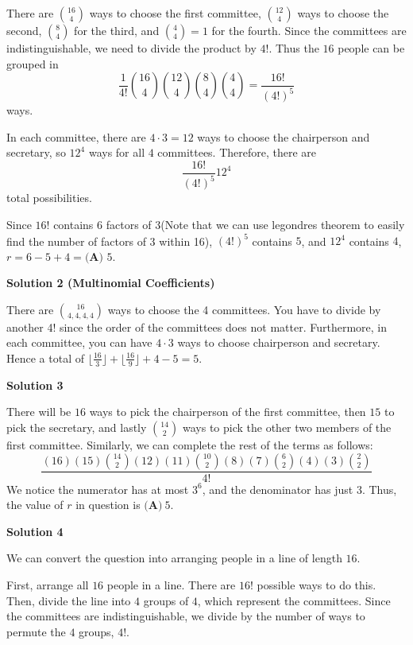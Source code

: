 \begin{enumerate}
There are ${16 \choose 4}$ ways to choose the first committee, ${12 \choose 4}$ ways to choose the second, ${8 \choose 4}$ for the third, and ${4 \choose 4}=1$ for the fourth. Since the committees are indistinguishable, we need to divide the product by $4!$. Thus the $16$ people can be grouped in
 \[\frac{1}{4!}{16 \choose 4}{12 \choose 4}{8 \choose 4}{4 \choose 4}=\frac{16!}{(4!)^5}\]ways.

 In each committee, there are $4 \cdot 3=12$ ways to choose the chairperson and secretary, so $12^4$ ways for all $4$ committees. Therefore, there are
 \[\frac{16!}{(4!)^5}12^4\]total possibilities.

 Since $16!$ contains $6$ factors of $3$(Note that we can use legondres theorem to easily find the number of factors of 3 within 16), $(4!)^5$ contains $5$, and $12^4$ contains $4$, $r=6-5+4=\boxed{\textbf{(A) }5}$.

 



\textbf{Solution 2 (Multinomial Coefficients)}

There are $\binom{16}{4,4,4,4}$ ways to choose the 4 committees. You have to divide by another 4! since the order of the committees does not matter. Furthermore, in each committee, you can have $4 \cdot 3$ ways to choose chairperson and secretary. Hence a total of $\lfloor{\frac{16}{3}\rfloor}+\lfloor{\frac{16}{9}\rfloor}+4-5=5.$




\textbf{Solution 3}

There will be $16$ ways to pick the chairperson of the first committee, then $15$ to pick the secretary, and lastly ${14 \choose 2}$ ways to pick the other two members of the first committee. Similarly, we can complete the rest of the terms as follows:
 \[\frac{(16)(15){14 \choose 2}(12)(11){10 \choose 2}(8)(7){6\choose 2}(4)(3){2\choose 2}}{4!}\]We notice the numerator has at most $3^6$, and the denominator has just $3$. Thus, the value of $r$ in question is $\boxed{\textbf{(A)}\ 5}$.

 



\textbf{Solution 4}

We can convert the question into arranging people in a line of length $16$.

 First, arrange all $16$ people in a line. There are $16!$ possible ways to do this. Then, divide the line into $4$ groups of $4$, which represent the committees. Since the committees are indistinguishable, we divide by the number of ways to permute the $4$ groups, $4!$.  


\end{enumerate}
